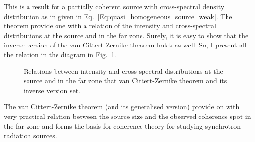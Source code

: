     This is a result for a partially coherent source with cross-spectral density distribution as in given in Eq.~\ref{Eq:quasi_homogeneous_source_weak}. The theorem provide one with a relation of the intensity and cross-spectral distributions at the source and in the far zone. Surely, it is easy to show that the inverse version of the van Cittert-Zernike theorem holds as well. So, I present all the relation in the diagram in Fig.~\ref{Fig:VCZ_scheme}.
    \begin{figure}[h!]
        \centering
        \caption{Relations between intensity and cross-spectral distributions at the source and in the far zone that van Cittert-Zernike theorem and its inverse version set.}
        \label{Fig:VCZ_scheme}
    \end{figure}
    The van Cittert-Zernike theorem (and its generalised version) provide on with very practical relation between the source size and the observed coherence spot in the far zone and forms the basis for coherence theory for studying synchrotron radiation sources. 

